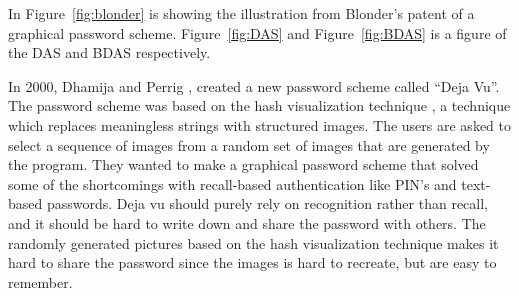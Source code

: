  In Figure~\ref{fig:blonder} is showing the illustration from Blonder's patent of a graphical password scheme. Figure~\ref{fig:DAS} and Figure~\ref{fig:BDAS} is a figure of the DAS and BDAS respectively.

  \begin{figure}[H]
    \centering
  \end{figure}

  In 2000, Dhamija and Perrig \cite{DejaVu}, created a new password scheme called ``Deja Vu''. The password scheme was based on the hash visualization technique \cite{HashVisualization}, a technique which replaces meaningless strings with structured images. The users are asked to select a sequence of images from a random set of images that are generated by the program. They wanted to make a graphical password scheme that solved some of the shortcomings with recall-based authentication like PIN's and text-based passwords. Deja vu should purely rely on recognition rather than recall, and it should be hard to write down and share the password with others. The randomly generated pictures based on the hash visualization technique makes it hard to share the password since the images is hard to recreate, but are easy to remember.

